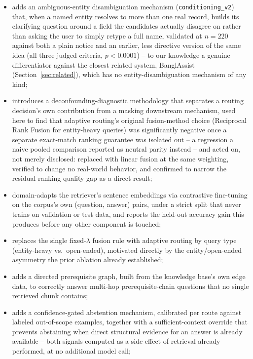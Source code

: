 \documentclass[a4paper,twoside]{article}
\begin{document}
\begin{itemize}
  \item adds an ambiguous-entity disambiguation mechanism (\texttt{conditioning\_v2}) that, when a named entity resolves to more than one real record, builds its clarifying question around a field the candidates actually disagree on rather than asking the user to simply retype a full name, validated at $n=220$ against both a plain notice and an earlier, less directive version of the same idea (all three judged criteria, $p<0.0001$) -- to our knowledge a genuine differentiator against the closest related system, BanglAssist (Section~\ref{sec:related}), which has no entity-disambiguation mechanism of any kind;
  \item introduces a deconfounding-diagnostic methodology that separates a routing decision's own contribution from a masking downstream mechanism, used here to find that adaptive routing's original fusion-method choice (Reciprocal Rank Fusion for entity-heavy queries) was significantly negative once a separate exact-match ranking guarantee was isolated out -- a regression a naive pooled comparison reported as neutral parity instead -- and acted on, not merely disclosed: replaced with linear fusion at the same weighting, verified to change no real-world behavior, and confirmed to narrow the residual ranking-quality gap as a direct result;
  \item domain-adapts the retriever's sentence embeddings via contrastive fine-tuning on the corpus's own (question, answer) pairs, under a strict split that never trains on validation or test data, and reports the held-out accuracy gain this produces before any other component is touched;
  \item replaces the single fixed-$\lambda$ fusion rule with adaptive routing by query type (entity-heavy vs.\ open-ended), motivated directly by the entity/open-ended asymmetry the prior ablation already established;
  \item adds a directed prerequisite graph, built from the knowledge base's own edge data, to correctly answer multi-hop prerequisite-chain questions that no single retrieved chunk contains;
  \item adds a confidence-gated abstention mechanism, calibrated per route against labeled out-of-scope examples, together with a sufficient-context override that prevents abstaining when direct structural evidence for an answer is already available -- both signals computed as a side effect of retrieval already performed, at no additional model call;

\end{itemize}
\end{document}
